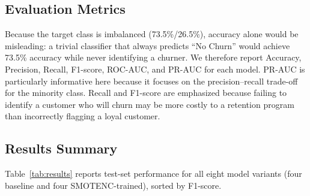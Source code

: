 \documentclass[conference]{IEEEtran}
\begin{document}
	\subsection{Evaluation Metrics}
	Because the target class is imbalanced (73.5\%/26.5\%), accuracy alone would be misleading: a trivial classifier that always predicts ``No Churn'' would achieve 73.5\% accuracy while never identifying a churner. We therefore report Accuracy, Precision, Recall, F1-score, ROC-AUC, and PR-AUC for each model. PR-AUC is particularly informative here because it focuses on the precision--recall trade-off for the minority class. Recall and F1-score are emphasized because failing to identify a customer who will churn may be more costly to a retention program than incorrectly flagging a loyal customer.
	
	\subsection{Results Summary}
	Table~\ref{tab:results} reports test-set performance for all eight model variants (four baseline and four SMOTENC-trained), sorted by F1-score.
	
	\begin{table}[htbp]
		\caption{Test-Set Performance, Sorted by F1-score}
		\label{tab:results}
		\begin{center}
			\scriptsize
		\end{center}
	\end{table}
	
\end{document}
